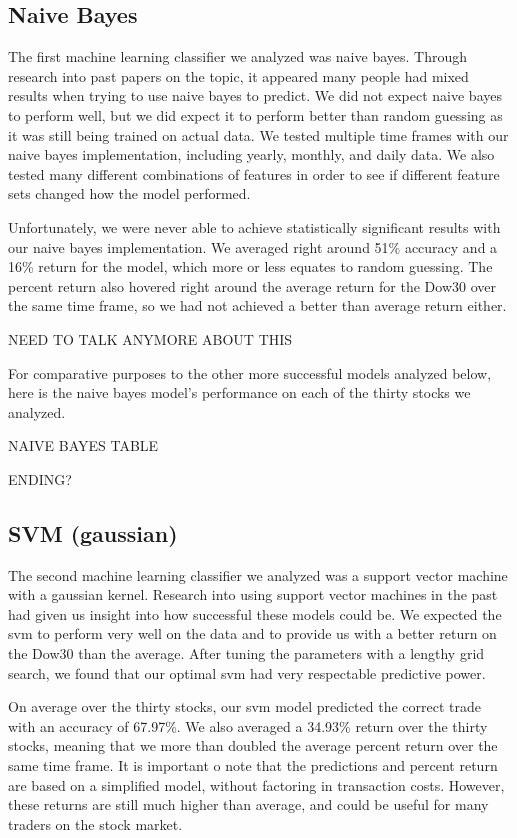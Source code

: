 \documentclass{article}
\begin{document}
\subsection{Naive Bayes}
The first machine learning classifier we analyzed was naive bayes. Through research into past papers on the topic, it appeared many people had mixed results when trying to use naive bayes to predict. We did not expect naive bayes to perform well, but we did expect it to perform better than random guessing as it was still being trained on actual data. We tested multiple time frames with our naive bayes implementation, including yearly, monthly, and daily data. We also tested many different combinations of features in order to see if different feature sets changed how the model performed.

Unfortunately, we were never able to achieve statistically significant results with our naive bayes implementation. We averaged right around 51\% accuracy and a 16\% return for the model, which more or less equates to random guessing. The percent return also hovered right around the average return for the Dow30 over the same time frame, so we had not achieved a better than average return either.

NEED TO TALK ANYMORE ABOUT THIS

For comparative purposes to the other more successful models analyzed below, here is the naive bayes model's performance on each of the thirty stocks we analyzed.

NAIVE BAYES TABLE

ENDING?

\subsection{SVM (gaussian)}
The second machine learning classifier we analyzed was a support vector machine with a gaussian kernel. Research into using support vector machines in the past had given us insight into how successful these models could be. We expected the svm to perform very well on the data and to provide us with a better return on the Dow30 than the average. After tuning the parameters with a lengthy grid search, we found that our optimal svm had very respectable predictive power.

On average over the thirty stocks, our svm model predicted the correct trade with an accuracy of 67.97\%. We also averaged a 34.93\% return over the thirty stocks, meaning that we more than doubled the average percent return over the same time frame. It is important o note that the predictions and percent return are based on a simplified model, without factoring in transaction costs. However, these returns are still much higher than average, and could be useful for many traders on the stock market.
\end{document}
